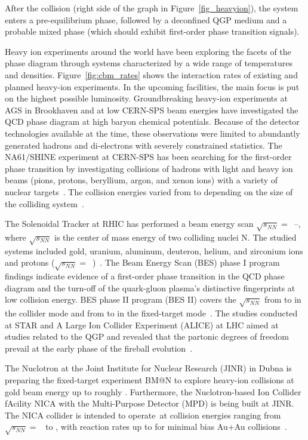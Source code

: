  After the collision (right side of the graph in Figure~\ref{fig_heavyion}), the system enters a pre-equilibrium phase, followed by a deconfined QGP medium and a probable mixed phase (which should exhibit first-order phase transition signals).

Heavy ion experiments around the world have been exploring the facets of the phase diagram through systems characterized by a wide range of temperatures and densities. Figure~\ref{fig:cbm_rates} shows the interaction rates of existing and planned heavy-ion experiments. In the upcoming facilities, the main focus is put on the highest possible luminosity. Groundbreaking heavy-ion experiments at AGS in Brookhaven and at low CERN-SPS beam energies have investigated the QCD phase diagram at high baryon chemical potentials. Because of the detector technologies available at the time, these observations were limited to abundantly generated hadrons and di-electrons with severely constrained statistics. The NA61/SHINE experiment at CERN-SPS has been searching for the first-order phase transition by investigating collisions of hadrons with light and heavy ion beams (pions, protons, beryllium, argon, and xenon ions) with a variety of nuclear targets~\cite{CBM_physics, Turko:2301677}. The collision energies varied from  to  depending on the size of the colliding system~\cite{na61energy}. 

The Solenoidal Tracker at \gls{RHIC} has
performed a beam energy scan $\sqrt{s_{NN}} =$~--, where $\sqrt{s_{NN}}$ is the center of mass energy of two colliding nuclei N. The studied systems included gold, uranium, aluminum, deuteron, helium, and zirconium ions and protons ($\sqrt{s_{NN}}=$~)~\cite{Stefaniak:2022dxo}. The Beam Energy Scan (\gls{BES}) phase I program findings indicate evidence of a first-order phase transition in the QCD phase diagram and the turn-off of the quark-gluon plasma's distinctive fingerprints at low collision energy. BES phase II program (BES II) covers the $\sqrt{s_{NN}}$ from  to  in the collider mode and from  to  in the fixed-target mode~\cite{STAR2, STAR1}.
The studies conducted at \gls{STAR} and A Large Ion Collider Experiment (\gls{ALICE}) at \gls{LHC} aimed at studies related to the \gls{QGP} and revealed that the partonic degrees of freedom prevail at the early phase of the fireball evolution~\cite{CBM_physics}.


The Nuclotron at the Joint Institute for Nuclear Research (JINR) in Dubna is preparing the fixed-target experiment BM@N to explore heavy-ion collisions at gold beam energy up to roughly . Furthermore, the Nuclotron-based Ion Collider fAcility NICA with the Multi-Purpose Detector (MPD) is being built at JINR. The NICA collider is intended to operate at collision energies ranging from $\sqrt{s_{NN}} =$~ to , with reaction rates up to  for minimal bias Au+Au collisions~\cite{Ablyazimov_2017}.

